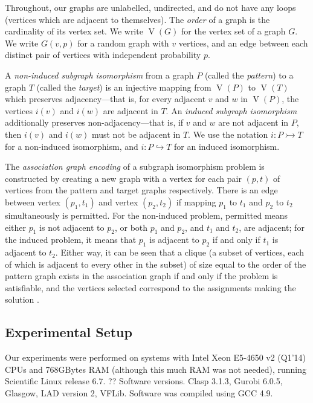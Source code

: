 \documentclass[letterpaper]{article}
\begin{document}
Throughout, our graphs are unlabelled, undirected, and do not have any loops (vertices which are
adjacent to themselves).  The \emph{order} of a graph is the cardinality of its vertex set. We write
$\operatorname{V}(G)$ for the vertex set of a graph $G$.  We write $G(v, p)$ for a random graph with
$v$ vertices, and an edge between each distinct pair of vertices with independent probability $p$.

A \emph{non-induced subgraph isomorphism} from a graph $P$ (called the \emph{pattern}) to a graph
$T$ (called the \emph{target}) is an injective mapping from $\operatorname{V}(P)$ to
$\operatorname{V}(T)$ which preserves adjacency---that is, for every adjacent $v$ and $w$ in
$\operatorname{V}(P)$, the vertices $i(v)$ and $i(w)$ are adjacent in $T$. An \emph{induced subgraph
isomorphism} additionally preserves non-adjacency---that is, if $v$ and $w$ are not adjacent in $P$,
then $i(v)$ and $i(w)$ must not be adjacent in $T$. We use the notation $i : P \rightarrowtail T$
for a non-induced isomorphism, and $i : P \hookrightarrow T$ for an induced isomorphism.

The \emph{association graph encoding} of a subgraph isomorphism problem is constructed by creating a
new graph with a vertex for each pair $(p, t)$ of vertices from the pattern and target graphs
respectively. There is an edge between vertex $(p_1, t_1)$ and vertex $(p_2, t_2)$ if mapping $p_1$
to $t_1$ and $p_2$ to $t_2$ simultaneously is permitted. For the non-induced problem, permitted
means either $p_1$ is not adjacent to $p_2$, or both $p_1$ and $p_2$, and $t_1$ and $t_2$, are
adjacent; for the induced problem, it means that $p_1$ is adjacent to $p_2$ if and only if $t_1$ is
adjacent to $t_2$. Either way, it can be seen that a clique (a subset of vertices, each of which is
adjacent to every other in the subset) of size equal to the order of the pattern graph exists in the
association graph if and only if the problem is satisfiable, and the vertices selected correspond to
the assignments making the solution \citep{Levi:1973}.

\subsection{Experimental Setup}

Our experiments were performed on systems with Intel Xeon E5-4650 v2 (Q1'14) CPUs and 768GBytes RAM
(although this much RAM was not needed), running Scientific Linux release 6.7.   ?? Software
versions. Clasp 3.1.3, Gurobi 6.0.5, Glasgow, LAD version 2, VFLib. Software was compiled using GCC
4.9.
\end{document}
